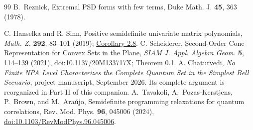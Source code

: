 \documentclass[11pt]{article}
\theoremstyle{remark}\newtheorem{remark}[theorem]{Remark}
\begin{document}
\begin{thebibliography}{99}
B.~Reznick,
Extremal PSD forms with few terms,
Duke Math. J. \textbf{45}, 363 (1978).

 C. Hanselka and R. Sinn, Positive semidefinite univariate matrix
polynomials, \emph{Math. Z.} \textbf{292}, 83--101 (2019);
\href{https://arxiv.org/pdf/1707.08261}{Corollary 2.8}.
 C. Scheiderer, Second-Order Cone Representation for Convex Sets in
the Plane, \emph{SIAM J. Appl. Algebra Geom.} \textbf{5}, 114--139 (2021),
\href{https://doi.org/10.1137/20M133717X}{doi:10.1137/20M133717X};
\href{https://arxiv.org/html/2004.04196v2}{Theorem 0.1}.
 A. Chaturvedi, \emph{No Finite NPA Level Characterizes the Complete
Quantum Set in the Simplest Bell Scenario}, project manuscript, September 2026. Its complete argument is reorganized
in Part II of this companion.
A.~Tavakoli, A.~Pozas-Kerstjens, P.~Brown, and M.~Ara\'ujo, Semidefinite programming relaxations for quantum correlations, Rev. Mod. Phys. \textbf{96}, 045006 (2024), \href{https://doi.org/10.1103/RevModPhys.96.045006}{doi:10.1103/RevModPhys.96.045006}.

\end{thebibliography}
\end{document}
